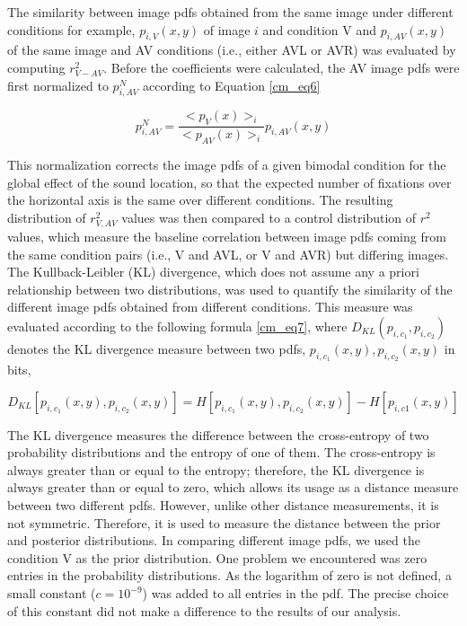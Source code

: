 The similarity between image pdfs obtained from the same image under
different conditions \textemdash for example, $p_{i,V}(x, y)$ of image $i$
and condition V and $p_{i,AV}(x, y)$ of the same image and AV conditions
(i.e., either AVL or AVR) \textemdash was evaluated by computing
$r_{V−AV}^2$. Before the coefficients were calculated, the AV image pdfs
were first normalized to $p_{i,AV}^N$ according to Equation \ref{cm_eq6}

\begin{equation} p_{i,AV}^{N} =
\frac{<p_V(x)>_i}{<p_{AV}(x)>_i}p_{i,AV}(x,y) \label{cm_eq6} \end{equation} 


This normalization corrects the image pdfs of a given bimodal condition for
the global effect of the sound location, so that the expected number of
fixations over the horizontal axis is the same over different conditions.
The resulting distribution of $r_{V,AV}^2$ values was then compared to a
control distribution of $r^2$ values, which measure the baseline
correlation between image pdfs coming from the same condition pairs (i.e.,
V and AVL, or V and AVR) but differing images. The Kullback-Leibler (KL)
divergence, which does not assume any a priori relationship between two
distributions, was used to quantify the similarity of the different image
pdfs obtained from different conditions. This measure was evaluated
according to the following formula \ref{cm_eq7}, where $D_{KL}(p_{i,c_1},
p_{i,c_2})$ denotes the KL divergence measure between two pdfs,
$p_{i,c_1}(x, y), p_{i,c_2} (x,y)$ in bits, 

\begin{equation} D_{KL}[p_{i,c_1}(x,y),p_{i,c_2}(x,y)] =
H[p_{i,c_1}(x,y),p_{i,c_2}(x,y)] -H[p_{i,c1}(x,y)] \label{cm_eq7}
\end{equation} 


The KL divergence measures the difference between the
cross-entropy of two probability distributions and the entropy of one of
them. The cross-entropy is always greater than or equal to the entropy;
therefore, the KL divergence is always greater than or equal
to zero, which allows its usage as a distance measure between two different
pdfs. However, unlike other distance measurements, it is not symmetric.
Therefore, it is used to measure the distance between the prior and
posterior distributions. In comparing different image pdfs, we used the
condition V as the prior distribution. One problem we encountered was zero
entries in the probability distributions. As the logarithm of zero is not
defined, a small constant ($c = 10^{-9}$) was added to all entries in the
pdf. The precise choice of this constant did not make a difference to the
results of our analysis.

